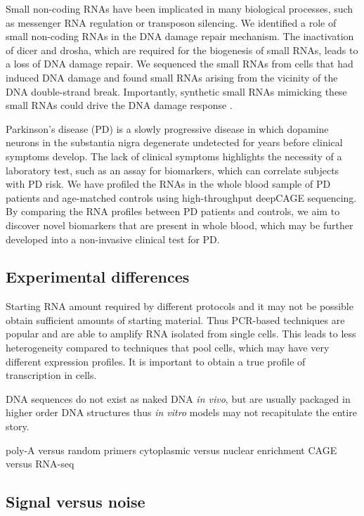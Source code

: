 \setlength{\parskip}{\baselineskip}%
\setlength{\parindent}{0pt}%

Small non-coding RNAs have been implicated in many biological processes, such as messenger RNA regulation or transposon silencing. We identified a role of small non-coding RNAs in the DNA damage repair mechanism. The inactivation of dicer and drosha, which are required for the biogenesis of small RNAs, leads to a loss of DNA damage repair. We sequenced the small RNAs from cells that had induced DNA damage and found small RNAs arising from the vicinity of the DNA double-strand break. Importantly, synthetic small RNAs mimicking these small RNAs could drive the DNA damage response \cite{francia2012site}.

Parkinson’s disease (PD) is a slowly progressive disease in which dopamine neurons in the substantia nigra degenerate undetected for years before clinical symptoms develop. The lack of clinical symptoms highlights the necessity of a laboratory test, such as an assay for biomarkers, which can correlate subjects with PD risk. We have profiled the RNAs in the whole blood sample of PD patients and age-matched controls using high-throughput deepCAGE sequencing. By comparing the RNA profiles between PD patients and controls, we aim to discover novel biomarkers that are present in whole blood, which may be further developed into a non-invasive clinical test for PD.

\subsection{Experimental differences}

Starting RNA amount required by different protocols and it may not be possible obtain sufficient amounts of starting material. Thus PCR-based techniques are popular and are able to amplify RNA isolated from single cells. This leads to less heterogeneity compared to techniques that pool cells, which may have very different expression profiles. It is important to obtain a true profile of transcription in cells.

DNA sequences do not exist as naked DNA \textit{in vivo}, but are usually packaged in higher order DNA structures thus \textit{in vitro} models may not recapitulate the entire story.

poly-A versus random primers
cytoplasmic versus nuclear enrichment
CAGE versus RNA-seq

\subsection{Signal versus noise}


